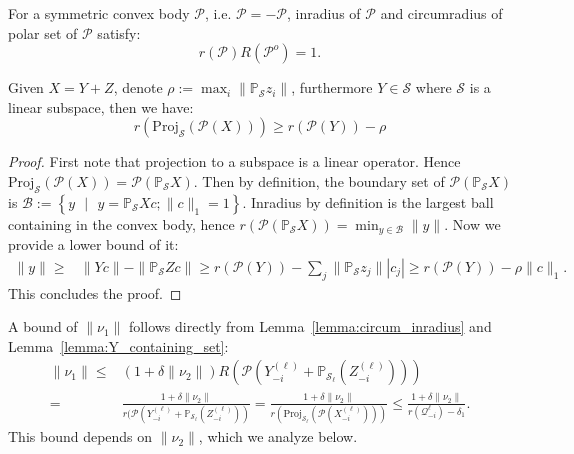 \documentclass[twoside,11pt]{article}
\numberwithin{equation}{section}
\begin{document}
\begin{lemma}\label{lemma:circum_inradius}
For a symmetric convex body $\mathcal{P}$, i.e. $\mathcal{P}=-\mathcal{P}$, inradius of $\mathcal{P}$ and circumradius of polar set of $\mathcal{P}$ satisfy:
\begin{equation*}
    r(\mathcal{P})R(\mathcal{P}^o)=1.
\end{equation*}
\end{lemma}
\begin{lemma}\label{lemma:Y_containing_set}
Given $X=Y+Z$,  denote $\rho:=\max_{i}\|\mathbb{P}_\mathcal{S}z_i\|$, furthermore $Y\in \mathcal{S}$ where $\mathcal{S}$ is a linear subspace, then we have:
\begin{equation*}
    r(\mathrm{Proj}_\mathcal{S} (\mathcal{P}(X))) \geq r(\mathcal{P}(Y)) - \rho
\end{equation*}
\end{lemma}
\begin{proof}
First note that projection to a subspace is a linear operator. Hence $\mathrm{Proj}_\mathcal{S}(\mathcal{P}(X))=\mathcal{P}(\mathbb{P}_\mathcal{S} X)$. Then by definition, the boundary set of $\mathcal{P}(\mathbb{P}_\mathcal{S} X)$ is $\mathcal{B}:=\left\{y\text{ }|\text{ }y=\mathbb{P}_\mathcal{S} X c; \|c\|_1=1\right\}$. Inradius by definition is the largest ball containing in the convex body, hence $r(\mathcal{P}(\mathbb{P}_\mathcal{S} X)) = \min_{y\in \mathcal{B}} \|y\|$. Now we provide a lower bound of it:
\begin{align*}
\|y\| \geq& \|Yc\|-\|\mathbb{P}_\mathcal{S}Z c\|\geq r(\mathcal{P}(Y)) - {\sum}_j{\|\mathbb{P}_\mathcal{S}z_j}\||c_j|
\geq r(\mathcal{P}(Y)) - \rho\|c\|_1.
\end{align*}
This concludes the proof.
\end{proof}
A bound of $\|\nu_1\|$ follows directly from Lemma~\ref{lemma:circum_inradius} and Lemma~\ref{lemma:Y_containing_set}:
\begin{align}
\|\nu_1\| \leq& (1+\delta\|\nu_2\|)R(\mathcal{P}(Y_{-i}^{(\ell)}+\mathbb{P}_{\mathcal{S}_{\ell}}(Z_{-i}^{(\ell)})))\nonumber\\
=& \frac{1+\delta\|\nu_2\|}{r(\mathcal{P}(Y_{-i}^{(\ell)}+\mathbb{P}_{\mathcal{S}_{\ell}}(Z_{-i}^{(\ell)}))}
=\frac{1+\delta\|\nu_2\|}{r(\mathrm{Proj}_\mathcal{S_{\ell}} (\mathcal{P}(X_{-i}^{(\ell)})))}
\leq \frac{1+\delta\|\nu_2\|}{r{\left( \mathcal{Q}_{-i}^{\ell}\right)}-\delta_1}.\label{eq:nu1_bound}
\end{align}
This bound depends on $\|\nu_2\|$, which we analyze below.
\end{document}
